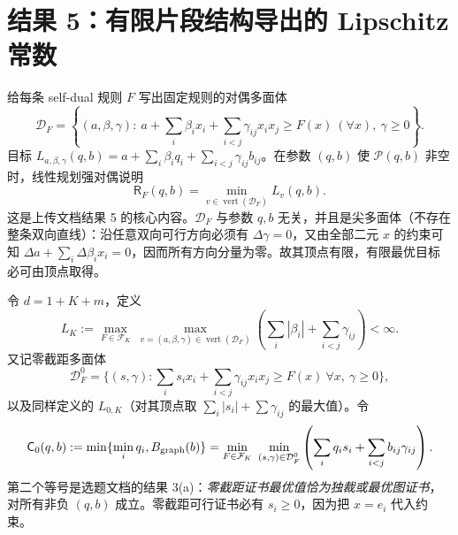 \documentclass[11pt,a4paper]{ctexart}
\theoremstyle{definition}
\newcommand{\calP}{\mathcal P}
\newcommand{\calF}{\mathcal F}
\newcommand{\Rsk}{\mathsf R}
\newcommand{\CGraph}{\mathsf C_0}
\begin{document}
\section{结果 5：有限片段结构导出的 Lipschitz 常数}
给每条 self-dual 规则 $F$ 写出固定规则的对偶多面体
\begin{equation}\label{eq:dual}
\mathcal D_F=\left\{(a,\beta,\gamma):\ a+\sum_i\beta_i x_i+\sum_{i<j}\gamma_{ij}x_ix_j\ge F(x)\ (\forall x),\ \gamma\ge0\right\}.
\end{equation}
目标 $L_{a,\beta,\gamma}(q,b)=a+\sum_i\beta_iq_i+\sum_{i<j}\gamma_{ij}b_{ij}$。在参数 $(q,b)$ 使 $\calP(q,b)$ 非空时，线性规划强对偶说明
\begin{equation}\label{eq:vertexF}
\Rsk_F(q,b)=\min_{v\in\operatorname{vert}(\mathcal D_F)}L_v(q,b).
\end{equation}
这是上传文档结果 5 的核心内容。$\mathcal D_F$ 与参数 $q,b$ 无关，并且是尖多面体（不存在整条双向直线）：沿任意双向可行方向必须有 $\Delta\gamma=0$，又由全部二元 $x$ 的约束可知 $\Delta a+\sum_i\Delta\beta_i x_i=0$，因而所有方向分量为零。故其顶点有限，有限最优目标必可由顶点取得。

令 $d=1+K+m$，定义
\begin{equation}\label{eq:LK}
L_K:=\max_{F\in\calF_K}\ \max_{v=(a,\beta,\gamma)\in\operatorname{vert}(\mathcal D_F)}\left(\sum_i|\beta_i|+\sum_{i<j}\gamma_{ij}\right)<\infty.
\end{equation}
又记零截距多面体
\[
\mathcal D_F^0=\{(s,\gamma):\sum_is_ix_i+\sum_{i<j}\gamma_{ij}x_ix_j\ge F(x)\ \forall x,\ \gamma\ge0\},
\]
以及同样定义的 $L_{0,K}$（对其顶点取 $\sum_i|s_i|+\sum\gamma_{ij}$ 的最大值）。令
\begin{equation}\label{eq:C0}
\CGraph(q,b):=\min\{\min_iq_i,B_{\rm graph}(b)\}
=\min_{F\in\calF_K}\ \min_{(s,\gamma)\in\mathcal D_F^0}\left(\sum_iq_is_i+\sum_{i<j}b_{ij}\gamma_{ij}\right).
\end{equation}
第二个等号是选题文档的结果 3(a)：\emph{零截距证书最优值恰为独裁或最优图证书}，对所有非负 $(q,b)$ 成立。零截距可行证书必有 $s_i\ge0$，因为把 $x=e_i$ 代入约束。
\end{document}

